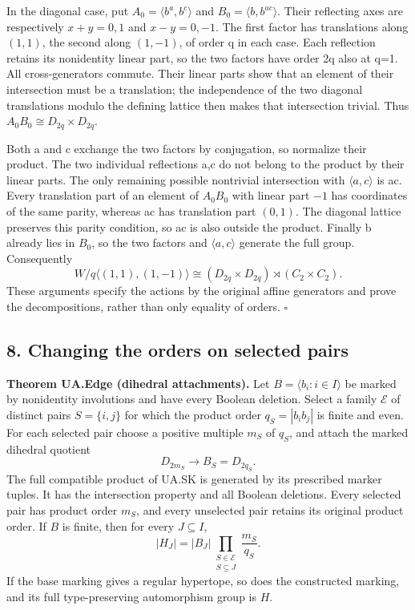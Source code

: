 \documentclass[
  11pt,
  a4paper,
]{article}
\begin{document}
In the diagonal case, put \(A_0=\langle b^a,b^c\rangle\) and
\(B_0=\langle b,b^{ac}\rangle\). Their reflecting axes are respectively
\(x+y=0,1\) and \(x-y=0,-1\). The first factor has translations along
\((1,1)\), the second along \((1,-1)\), of order q in each case. Each
reflection retains its nonidentity linear part, so the two factors have
order 2q also at q=1. All cross-generators commute. Their linear parts
show that an element of their intersection must be a translation; the
independence of the two diagonal translations modulo the defining
lattice then makes that intersection trivial. Thus
\(A_0B_0\cong D_{2q}\times D_{2q}\).

Both a and c exchange the two factors by conjugation, so normalize their
product. The two individual reflections a,c do not belong to the product
by their linear parts. The only remaining possible nontrivial
intersection with \(\langle a,c\rangle\) is ac. Every translation part
of an element of \(A_0B_0\) with linear part \(-1\) has coordinates of
the same parity, whereas ac has translation part \((0,1)\). The diagonal
lattice preserves this parity condition, so ac is also outside the
product. Finally b already lies in \(B_0\), so the two factors and
\(\langle a,c\rangle\) generate the full group. Consequently \[
 W/q\langle(1,1),(1,-1)\rangle
 \cong(D_{2q}\times D_{2q})\rtimes(C_2\times C_2).
 \tag{S4}
\] These arguments specify the actions by the original affine generators
and prove the decompositions, rather than only equality of orders.
\(\square\)

\subsection{8. Changing the orders on selected
pairs}\label{changing-the-orders-on-selected-pairs}

\textbf{Theorem UA.Edge (dihedral attachments).} Let
\(B=\langle b_i:i\in I\rangle\) be marked by nonidentity involutions and
have every Boolean deletion. Select a family \(\mathcal E\) of distinct
pairs \(S=\{i,j\}\) for which the product order \(q_S=|b_i b_j|\) is
finite and even. For each selected pair choose a positive multiple
\(m_S\) of \(q_S\), and attach the marked dihedral quotient \[
D_{2m_S}\longrightarrow B_S=D_{2q_S}.
\] The full compatible product of UA.SK is generated by its prescribed
marker tuples. It has the intersection property and all Boolean
deletions. Every selected pair has product order \(m_S\), and every
unselected pair retains its original product order. If \(B\) is finite,
then for every \(J\subseteq I\), \[
|H_J|=|B_J|\prod_{\substack{S\in\mathcal E\\S\subseteq J}}\frac{m_S}{q_S}.
\tag{E1}
\] If the base marking gives a regular hypertope, so does the
constructed marking, and its full type-preserving automorphism group is
\(H\).
\end{document}
